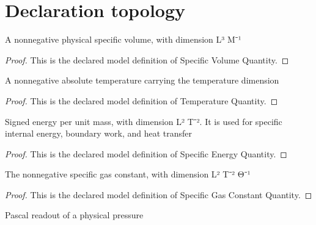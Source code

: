 \section{Declaration topology}
\begin{definition}
  \label{def:physics:phyx-mini-0459:phyxminiproblems-problemphyxmini0459-specificvolumequantity}
  A nonnegative physical specific volume, with dimension L³ M⁻¹
\end{definition}
\begin{proof}
  This is the declared model definition of Specific Volume Quantity.
\end{proof}
\begin{definition}
  \label{def:physics:phyx-mini-0459:phyxminiproblems-problemphyxmini0459-temperaturequantity}
  A nonnegative absolute temperature carrying the temperature dimension
\end{definition}
\begin{proof}
  This is the declared model definition of Temperature Quantity.
\end{proof}
\begin{definition}
  \label{def:physics:phyx-mini-0459:phyxminiproblems-problemphyxmini0459-specificenergyquantity}
  Signed energy per unit mass, with dimension L² T⁻². It is used for specific internal energy, boundary work, and heat transfer
\end{definition}
\begin{proof}
  This is the declared model definition of Specific Energy Quantity.
\end{proof}
\begin{definition}
  \label{def:physics:phyx-mini-0459:phyxminiproblems-problemphyxmini0459-specificgasconstantquantity}
  The nonnegative specific gas constant, with dimension L² T⁻² Θ⁻¹
\end{definition}
\begin{proof}
  This is the declared model definition of Specific Gas Constant Quantity.
\end{proof}
\begin{definition}
  \label{def:physics:phyx-mini-0459:phyxminiproblems-problemphyxmini0459-pressureinpascals}
  Pascal readout of a physical pressure
\end{definition}
